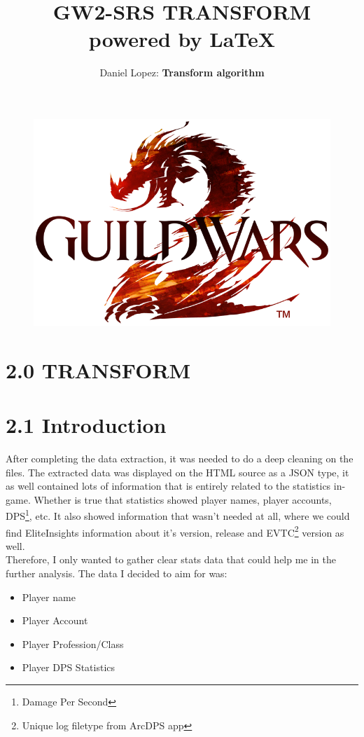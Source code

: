 \documentclass[12pt,a4paper]{article}
\title{%
    \vspace*{-5mm}\Huge GW2-SRS TRANSFORM \\
    \vspace*{2mm}\Large powered by \LaTeX}
\author{\vspace*{-5mm}\large Daniel Lopez: \textbf{Transform algorithm}}
\begin{document}
    \maketitle

    \begin{figure}[H]
        \centering
        \includegraphics[width=1 \textwidth]{Images/Nuevo_logo_GW2.png}
    \end{figure}

    \newpage

    \section*{2.0 TRANSFORM}

    \section*{\large 2.1 Introduction}
    After completing the data extraction, it was needed to do a deep cleaning on the files.
    The extracted data was displayed on the HTML source as a JSON type, it as well contained
    lots of information that is entirely related to the statistics in-game. Whether is true that
    statistics showed player names, player accounts, DPS\footnote{Damage Per Second}, etc. It
    also showed information that wasn't needed at all, where we could find EliteInsights information
    about it's version, release and EVTC\footnote{Unique log filetype from ArcDPS app} version as well.\\

    Therefore, I only wanted to gather clear stats data that could help me in the further
    analysis. The data I decided to aim for was:
    \begin{itemize}
        \item Player name
        \item Player Account
        \item Player Profession/Class
        \item Player DPS Statistics
    \end{itemize}
\end{document}
